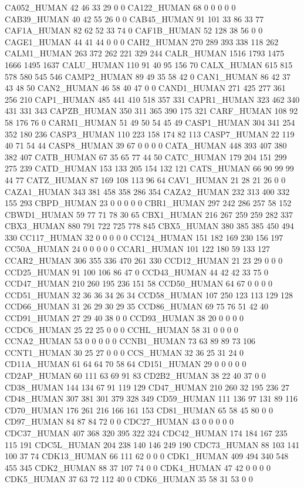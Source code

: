 CA052_HUMAN	42	46	33	29	0	0
CA122_HUMAN	68	0	0	0	0	0
CAB39_HUMAN	40	42	55	26	0	0
CAB45_HUMAN	91	101	33	86	33	77
CAF1A_HUMAN	82	62	52	33	74	0
CAF1B_HUMAN	52	128	38	56	0	0
CAGE1_HUMAN	44	41	44	0	0	0
CAH2_HUMAN	270	289	393	338	118	262
CALM1_HUMAN	263	372	262	221	329	244
CALR_HUMAN	1516	1793	1475	1666	1495	1637
CALU_HUMAN	110	91	40	95	156	70
CALX_HUMAN	615	815	578	580	545	546
CAMP2_HUMAN	89	49	35	58	42	0
CAN1_HUMAN	86	42	37	43	48	50
CAN2_HUMAN	46	58	40	47	0	0
CAND1_HUMAN	271	425	277	361	256	210
CAP1_HUMAN	485	441	410	518	357	331
CAPR1_HUMAN	323	462	340	431	331	343
CAPZB_HUMAN	350	311	365	390	175	321
CARF_HUMAN	108	92	58	176	76	0
CARM1_HUMAN	51	49	50	54	45	49
CASP1_HUMAN	304	341	254	352	180	236
CASP3_HUMAN	110	223	158	174	82	113
CASP7_HUMAN	22	119	40	71	54	44
CASP8_HUMAN	39	67	0	0	0	0
CATA_HUMAN	448	393	407	380	382	407
CATB_HUMAN	67	35	65	77	44	50
CATC_HUMAN	179	204	151	299	275	239
CATD_HUMAN	153	133	205	154	132	121
CATS_HUMAN	66	90	99	99	44	77
CATZ_HUMAN	87	169	108	113	96	64
CAV1_HUMAN	21	28	21	26	0	0
CAZA1_HUMAN	343	381	458	358	286	354
CAZA2_HUMAN	232	313	400	332	155	293
CBPD_HUMAN	23	0	0	0	0	0
CBR1_HUMAN	297	242	286	257	58	152
CBWD1_HUMAN	59	77	71	78	30	65
CBX1_HUMAN	216	267	259	259	282	337
CBX3_HUMAN	880	791	722	725	778	845
CBX5_HUMAN	380	385	385	450	494	330
CC117_HUMAN	32	0	0	0	0	0
CC124_HUMAN	151	182	169	230	156	197
CC50A_HUMAN	24	0	0	0	0	0
CCAR1_HUMAN	101	122	180	59	133	127
CCAR2_HUMAN	306	355	336	470	261	330
CCD12_HUMAN	21	23	29	0	0	0
CCD25_HUMAN	91	100	106	86	47	0
CCD43_HUMAN	44	42	42	33	75	0
CCD47_HUMAN	210	260	195	236	151	58
CCD50_HUMAN	64	67	0	0	0	0
CCD51_HUMAN	32	36	36	34	26	34
CCD58_HUMAN	107	250	123	113	129	128
CCD66_HUMAN	31	26	29	30	29	35
CCD86_HUMAN	69	75	76	51	42	40
CCD91_HUMAN	27	29	40	38	0	0
CCD93_HUMAN	38	20	0	0	0	0
CCDC6_HUMAN	25	22	25	0	0	0
CCHL_HUMAN	58	31	0	0	0	0
CCNA2_HUMAN	53	0	0	0	0	0
CCNB1_HUMAN	73	63	89	89	73	106
CCNT1_HUMAN	30	25	27	0	0	0
CCS_HUMAN	32	36	25	31	24	0
CD11A_HUMAN	61	64	64	70	58	64
CD151_HUMAN	29	0	0	0	0	0
CD2AP_HUMAN	60	111	63	69	91	83
CD2B2_HUMAN	38	22	40	37	0	0
CD38_HUMAN	144	134	67	91	119	129
CD47_HUMAN	210	260	32	195	236	27
CD48_HUMAN	307	381	301	379	328	349
CD59_HUMAN	111	136	97	131	89	116
CD70_HUMAN	176	261	216	166	161	153
CD81_HUMAN	65	58	45	80	0	0
CD97_HUMAN	84	87	84	72	0	0
CDC27_HUMAN	43	0	0	0	0	0
CDC37_HUMAN	407	368	320	395	322	324
CDC42_HUMAN	174	184	167	235	115	191
CDC5L_HUMAN	204	238	140	146	249	190
CDC73_HUMAN	88	103	141	100	37	74
CDK13_HUMAN	66	111	62	0	0	0
CDK1_HUMAN	409	494	340	548	455	345
CDK2_HUMAN	88	37	107	74	0	0
CDK4_HUMAN	47	42	0	0	0	0
CDK5_HUMAN	37	63	72	112	40	0
CDK6_HUMAN	35	58	31	53	0	0
